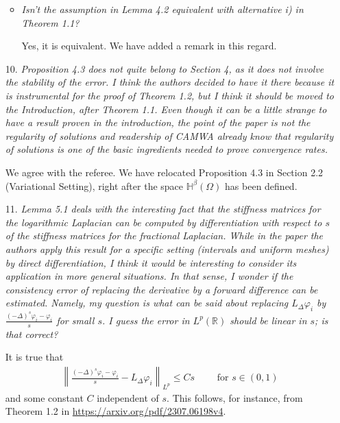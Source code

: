 \documentclass[11 pt]{article}
\numberwithin{equation}{section}
\begin{document}
\begin{enumerate}
\begin{itemize}
        \item \emph{Isn't the assumption in Lemma 4.2 equivalent with alternative i) in Theorem 1.1?}

    Yes, it is equivalent. We have added a remark in this regard.

    \end{itemize}

    \item[10.] \emph{Proposition 4.3 does not quite belong to Section 4, as it does not involve the stability of the error. I think the authors decided to have it there because it is instrumental for the proof of Theorem 1.2, but I think it should be moved to the Introduction, after Theorem 1.1. Even though it can be a little strange to have a result proven in the introduction, the point of the paper is not the regularity of solutions and readership of CAMWA already know that regularity of solutions is one of the basic ingredients needed to prove convergence rates.}

    We agree with the referee.  We have relocated Proposition 4.3 in Section 2.2 (Variational Setting), right after the space $\mathbb H^{\beta}(\Omega)$ has been defined.


    \item[11.] \emph{Lemma 5.1 deals with the interesting fact that the stiffness matrices for the logarithmic Laplacian can be computed by differentiation with respect to \(s\) of the stiffness matrices for the fractional Laplacian. While in the paper the authors apply this result for a specific setting (intervals and uniform meshes) by direct differentiation, I think it would be interesting to consider its application in more general situations. In that sense, I wonder if the consistency error of replacing the derivative by a forward difference can be estimated. Namely, my question is what can be said about replacing \(L_{\Delta}\varphi_{i}\) by \(\frac{(-\Delta)^{s}\varphi_{i}-\varphi_{i}}{s}\) for small \(s\). I guess the error in \(L^{p}(\mathbb{R})\) should be linear in \(s\); is that correct?}

    It is true that
    \begin{align*}
     \left\|\frac{(-\Delta)^{s}\varphi_{i}-\varphi_{i}}{s}-L_{\Delta}\varphi_{i}\right\|_{L^p}\leq Cs\qquad \text{ for }s\in (0,1)
    \end{align*}
    and some constant $C$ independent of $s$.  This follows, for instance, from Theorem 1.2 in \url{https://arxiv.org/pdf/2307.06198v4}.


\end{enumerate}
\end{document}

